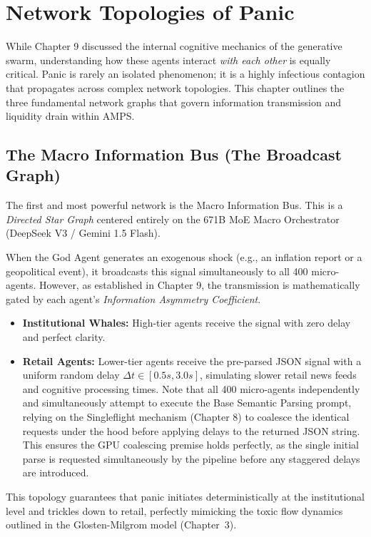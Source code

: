 \chapter{Network Topologies of Panic}
\label{ch:network_topologies}

While Chapter 9 discussed the internal cognitive mechanics of the generative swarm, understanding how these agents interact \textit{with each other} is equally critical. Panic is rarely an isolated phenomenon; it is a highly infectious contagion that propagates across complex network topologies. This chapter outlines the three fundamental network graphs that govern information transmission and liquidity drain within AMPS.

\section{The Macro Information Bus (The Broadcast Graph)}

The first and most powerful network is the Macro Information Bus. This is a \textit{Directed Star Graph} centered entirely on the 671B MoE Macro Orchestrator (DeepSeek V3 / Gemini 1.5 Flash). 

When the God Agent generates an exogenous shock (e.g., an inflation report or a geopolitical event), it broadcasts this signal simultaneously to all 400 micro-agents. However, as established in Chapter 9, the transmission is mathematically gated by each agent's \textit{Information Asymmetry Coefficient}.

\begin{itemize}
    \item \textbf{Institutional Whales:} High-tier agents receive the signal with zero delay and perfect clarity.
    \item \textbf{Retail Agents:} Lower-tier agents receive the pre-parsed JSON signal with a uniform random delay $\Delta t \in [0.5s, 3.0s]$, simulating slower retail news feeds and cognitive processing times. Note that all 400 micro-agents independently and simultaneously attempt to execute the Base Semantic Parsing prompt, relying on the Singleflight mechanism (Chapter 8) to coalesce the identical requests under the hood before applying delays to the returned JSON string. This ensures the GPU coalescing premise holds perfectly, as the single initial parse is requested simultaneously by the pipeline before any staggered delays are introduced.
\end{itemize}

This topology guarantees that panic initiates deterministically at the institutional level and trickles down to retail, perfectly mimicking the toxic flow dynamics outlined in the Glosten-Milgrom model \cite{glosten1985bid} (Chapter~3).

